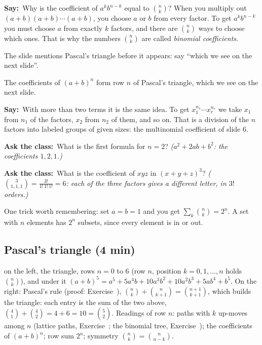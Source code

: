 \documentclass[11pt,a4paper,parskip=half]{scrartcl}
\newcommand{\say}{\textbf{\color{teal}Say:}\ }
\newcommand{\ask}{\textbf{\color{navy}Ask the class:}\ }
\begin{document}
\say Why is the coefficient of $a^kb^{n-k}$ equal to $\binom nk$? When you
multiply out $(a+b)(a+b)\cdots(a+b)$, you choose $a$ or $b$ from every
factor. To get $a^kb^{n-k}$ you must choose $a$ from exactly $k$ factors,
and there are $\binom nk$ ways to choose which ones. That is why the numbers
$\binom nk$ are called \emph{binomial coefficients}.

\begin{cue}
	The slide mentions Pascal's triangle before it appears: say ``which we see
	on the next slide''.
\end{cue}

The coefficients of $(a+b)^n$ form row $n$ of Pascal's triangle, which we
see on the next slide.

\say With more than two terms it is the same idea. To get
$x_1^{n_1}\cdots x_r^{n_r}$ we take $x_1$ from $n_1$ of the factors, $x_2$
from $n_2$ of them, and so on. That is a division of the $n$ factors into
labeled groups of given sizes: the multinomial coefficient of slide 6.

\ask What is the first formula for $n=2$? \emph{($a^2+2ab+b^2$: the
coefficients $1,2,1$.)}

\ask What is the coefficient of $xyz$ in $(x+y+z)^3$? \emph{($\binom{3}{1,1,1}
=\frac{3!}{1!\,1!\,1!}=6$: each of the three factors gives a different
letter, in $3!$ orders.)}

One trick worth remembering: set $a=b=1$ and you get
$\sum_k\binom nk=2^n$. A set with $n$ elements has $2^n$ subsets, since
every element is in or out.

\needspace{0.35\textheight}
\subsection{Pascal's triangle (4 min)}

\begin{onslide}
	on the left, the triangle, rows $n=0$ to $6$ (row $n$, position
	$k=0,1,\dots,n$ holds $\binom nk$), and under it
	$(a+b)^5=a^5+5a^4b+10a^3b^2+10a^2b^3+5ab^4+b^5$. On the right: Pascal's
	rule (proof: Exercise~),
	$\binom nk+\binom n{k+1}=\binom{n+1}{k+1}$, which builds the triangle:
	each entry is the sum of the two above, $\binom41+\binom42=4+6=10=\binom52$.
	Readings of row $n$: paths with $k$ up-moves among $n$ (lattice paths,
	Exercise~; the binomial tree,
	Exercise~); the coefficients of $(a+b)^n$; row sum
	$2^n$; symmetry $\binom nk=\binom n{n-k}$.
\end{onslide}
\end{document}
